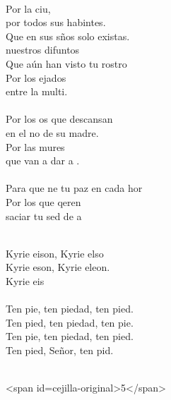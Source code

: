 \begin{cancion}[Noche][Hakuna]
\begin{chorus}
	\end{chorus}%
	\jump\\
	Por la ciu,\\
	por todos sus habintes.\\
	Que en sus sños solo existas. \\
	 nuestros difuntos\\
	Que aún  han visto tu rostro\\
	Por los ejados\\
	entre la multi.\\
\jump\\
	Por los os que descansan \\
	en el no de su madre.\\
	Por las mures\\
	que van a dar a .\\
\jump\\
	Para que ne tu paz en cada hor\\
	Por los que qeren \\
	saciar tu sed de a \\\jump\\
	\begin{chorus}%
	Kyrie eison, Kyrie elso\\
	Kyrie eson, Kyrie eleon.\\
	Kyrie eis\\
\jump\\
	Ten pie, ten piedad, ten pied.\\
	Ten pied, ten piedad, ten pie.\\
	Ten pie, ten piedad, ten pied.\\
	Ten pied, Señor, ten pid.\\
	\end{chorus}%
	\jump\\
<span id=cejilla-original>5</span>\\
\end{cancion}%
